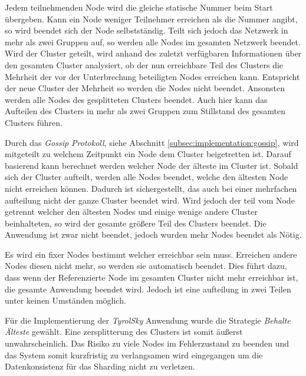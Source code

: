 \begin{itemize}
    Jedem teilnehmenden Node wird die gleiche statische Nummer beim Start übergeben. Kann ein Node weniger Teilnehmer erreichen als die Nummer angibt, so wird beendet sich der Node selbstständig. Teilt sich jedoch das Netzwerk in mehr als zwei Gruppen auf, so werden alle Nodes im gesamten Netzwerk beendet. 
    Wird der Cluster geteilt, wird anhand des zuletzt verfügbaren Informationen über den gesamten Cluster analysiert, ob der nun erreichbare Teil des Clusters die Mehrheit der vor der Unterbrechung  beteiligten Nodes  erreichen kann. Entspricht der neue Cluster der Mehrheit so werden die Nodes nicht beendet. Ansonsten werden alle Nodes des gesplitteten Clusters beendet. Auch hier kann das Aufteilen des Clusters in mehr als zwei Gruppen zum Stillstand des gesamten Clusters führen.

    Durch das \textit{Gossip Protokoll}, siehe Abschnitt \ref{subsec:implementation:gossip}, wird  mitgeteilt zu welchem Zeitpunkt ein Node dem Cluster beigetretten ist. Darauf basierend kann berechnet werden welcher Node der älteste im Cluster ist. Sobald sich der Cluster aufteilt, werden alle Nodes beendet, welche den ältesten Node nicht erreichen können. Dadurch ist sichergestellt, das auch bei einer mehrfachen aufteilung nicht der ganze Cluster beendet wird. Wird jedoch der teil vom Node getrennt welcher den ältesten Nodes und einige wenige andere Cluster beinhalteten, so wird der gesamte größere Teil des Clusters beendet. Die Anwendung ist zwar nicht beendet, jedoch wurden mehr Nodes beendet als Nötig. 

    Es wird ein fixer Nodes bestimmt welcher erreichbar sein muss. Erreichen andere Nodes diesen nicht mehr, so werden sie automatisch beendet. Dies führt dazu, dass wenn der Referenzierte Node im gesamten Cluster nicht mehr erreichbar ist, die gesamte Anwendung beendet wird. Jedoch ist eine aufteilung in zwei Teilen unter keinen Umständen möglich.
\end{itemize}
Für die Implementierung der \textit{TyrolSky} Anwendung wurde die Strategie \textit{Behalte Älteste} gewählt. Eine zersplitterung des Clusters ist somit äußerst unwahrscheinlich. Das Risiko zu viele Nodes im Fehlerzustand zu beenden und das System somit kurzfristig zu verlangsamen wird eingegangen um die Datenkonsistenz für das Sharding nicht zu verletzen.  

